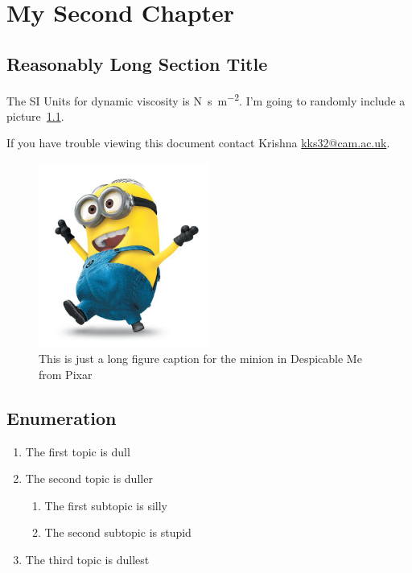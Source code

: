 \chapter{My Second Chapter}
\section[Short title]{Reasonably Long Section Title}

The SI Units for dynamic viscosity is \si{\newton\second\per\metre\squared}. I'm going to randomly include a picture~\cref{fig:minion}.


If you have trouble viewing this document contact Krishna \href{mailto:kks32@cam.ac.uk}{kks32@cam.ac.uk}. 


\begin{figure}[htbp!] 
\centering    
\includegraphics[width=0.5\textwidth]{Chapter2/Figs/minion.jpg}
\caption[Minion]{This is just a long figure caption for the minion in Despicable Me from Pixar}
\label{fig:minion}
\end{figure}


\section*{Enumeration}
\begin{enumerate}
\item The first topic is dull
\item The second topic is duller
\begin{enumerate}
\item The first subtopic is silly
\item The second subtopic is stupid
\end{enumerate}
\item The third topic is dullest
\end{enumerate}

